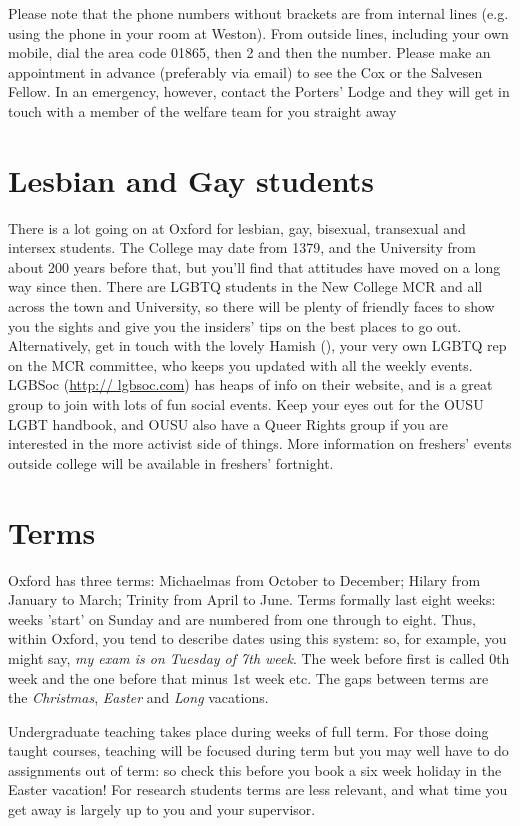Please note that the phone numbers without brackets are from internal lines (e.g. using the phone in your room at Weston). From outside lines, including your own mobile, dial the area code 01865, then 2 and then the number. Please make an appointment in advance (preferably via email) to see the Cox or the Salvesen Fellow. In an emergency, however, contact the Porters' Lodge and they will get in touch with a member of the welfare team for you straight away

\section{Lesbian and Gay students}
There is a lot going on at Oxford for lesbian, gay, bisexual, transexual and
intersex students. The College may date from 1379, and the University from about
200 years before that, but you'll find that attitudes have moved on a long way
since then. There are LGBTQ students in the New College MCR and all across the
town and University, so there will be plenty of friendly faces to show you the
sights and give you the insiders' tips on the best places to go out.
Alternatively, get in touch with the lovely Hamish
(\href{mailto:hamish.dustagheer@new.ox.ac.uk}{}), your very own LGBTQ rep on the MCR committee, who keeps you updated with all the weekly events. LGBSoc (\url{http:// lgbsoc.com}) has heaps of info on their website, and is a great group to join with lots of fun social events. Keep your eyes out for the OUSU LGBT handbook, and OUSU also have a Queer Rights group if you are interested in the more activist side of things. More information on freshers' events outside college will be available in freshers' fortnight.

\section{Terms}
Oxford has three terms: Michaelmas from October to December; Hilary from January
to March; Trinity from April to June. Terms formally last eight weeks: weeks
'start' on Sunday and are numbered from one through to eight. Thus, within
Oxford, you tend to describe dates using this system: so, for example, you might
say, \emph{my exam is on Tuesday of 7th week}. The week before first is called
0th week and the one before that minus 1st week etc. The gaps between terms are the \emph{Christmas}, \emph{Easter} and \emph{Long} vacations.
\medskip

Undergraduate teaching takes place during weeks of full term. For those doing taught courses, teaching will be focused during term but you may well have to do assignments out of term: so check this before you book a six week holiday in the Easter vacation! For research students terms are less relevant, and what time you get away is largely up to you and your supervisor.

